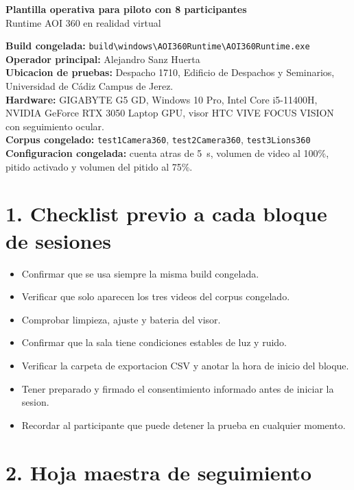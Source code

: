 \documentclass[10pt]{article}
\begin{document}
\begin{center}
{\LARGE \textbf{Plantilla operativa para piloto con 8 participantes}}\\[0.4em]
{\large Runtime AOI 360 en realidad virtual}
\end{center}

\textbf{Build congelada:} \texttt{build\textbackslash windows\textbackslash AOI360Runtime\textbackslash AOI360Runtime.exe}\\
\textbf{Operador principal:} Alejandro Sanz Huerta\\
\textbf{Ubicacion de pruebas:} Despacho 1710, Edificio de Despachos y Seminarios, Universidad de Cádiz Campus de Jerez.\\
\textbf{Hardware:} GIGABYTE G5 GD, Windows 10 Pro, Intel Core i5-11400H, NVIDIA GeForce RTX 3050 Laptop GPU, visor HTC VIVE FOCUS VISION con seguimiento ocular.\\
\textbf{Corpus congelado:} \texttt{test1Camera360}, \texttt{test2Camera360}, \texttt{test3Lions360}\\
\textbf{Configuracion congelada:} cuenta atras de 5~s, volumen de video al 100\%, pitido activado y volumen del pitido al 75\%.

\section*{1. Checklist previo a cada bloque de sesiones}
\begin{itemize}
  \item Confirmar que se usa siempre la misma build congelada.
  \item Verificar que solo aparecen los tres videos del corpus congelado.
  \item Comprobar limpieza, ajuste y bateria del visor.
  \item Confirmar que la sala tiene condiciones estables de luz y ruido.
  \item Verificar la carpeta de exportacion CSV y anotar la hora de inicio del bloque.
  \item Tener preparado y firmado el consentimiento informado antes de iniciar la sesion.
  \item Recordar al participante que puede detener la prueba en cualquier momento.
\end{itemize}

\section*{2. Hoja maestra de seguimiento}
\end{document}
